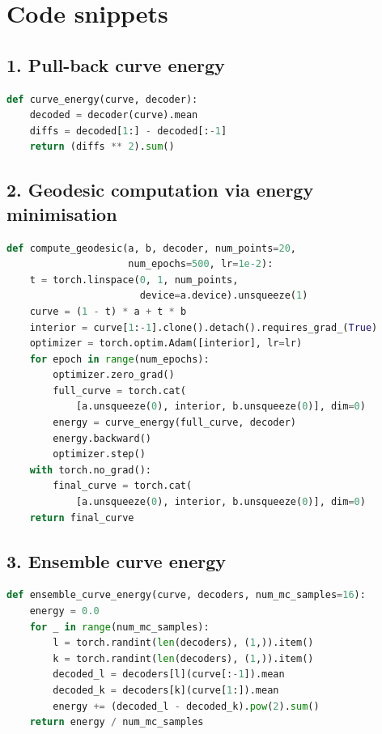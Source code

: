 \documentclass[10pt,a4paper]{article}
\begin{document}
\newpage


\section*{Code snippets}

\subsection*{1. Pull-back curve energy}

\begin{lstlisting}[language=Python, caption={Curve energy (ensemble\_vae.py)}]
def curve_energy(curve, decoder):
    decoded = decoder(curve).mean
    diffs = decoded[1:] - decoded[:-1]
    return (diffs ** 2).sum()
\end{lstlisting}

\subsection*{2. Geodesic computation via energy minimisation}

\begin{lstlisting}[language=Python, caption={Geodesic optimisation (ensemble\_vae.py)}]
def compute_geodesic(a, b, decoder, num_points=20,
                     num_epochs=500, lr=1e-2):
    t = torch.linspace(0, 1, num_points,
                       device=a.device).unsqueeze(1)
    curve = (1 - t) * a + t * b
    interior = curve[1:-1].clone().detach().requires_grad_(True)
    optimizer = torch.optim.Adam([interior], lr=lr)
    for epoch in range(num_epochs):
        optimizer.zero_grad()
        full_curve = torch.cat(
            [a.unsqueeze(0), interior, b.unsqueeze(0)], dim=0)
        energy = curve_energy(full_curve, decoder)
        energy.backward()
        optimizer.step()
    with torch.no_grad():
        final_curve = torch.cat(
            [a.unsqueeze(0), interior, b.unsqueeze(0)], dim=0)
    return final_curve
\end{lstlisting}

\subsection*{3. Ensemble curve energy}

\begin{lstlisting}[language=Python, caption={Ensemble curve energy (ensemble\_vae.py)}]
def ensemble_curve_energy(curve, decoders, num_mc_samples=16):
    energy = 0.0
    for _ in range(num_mc_samples):
        l = torch.randint(len(decoders), (1,)).item()
        k = torch.randint(len(decoders), (1,)).item()
        decoded_l = decoders[l](curve[:-1]).mean
        decoded_k = decoders[k](curve[1:]).mean
        energy += (decoded_l - decoded_k).pow(2).sum()
    return energy / num_mc_samples
\end{lstlisting}
\end{document}
